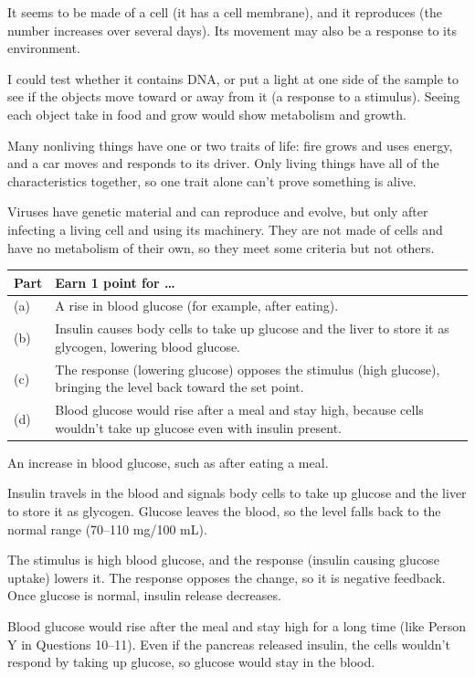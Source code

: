\documentclass[11pt,letterpaper]{article}
\begin{document}
\modelanswer
\begin{parts}
  \item It seems to be made of a cell (it has a cell membrane), and it reproduces (the number increases over several days). Its movement may also be a response to its environment.
  \item I could test whether it contains DNA, or put a light at one side of the sample to see if the objects move toward or away from it (a response to a stimulus). Seeing each object take in food and grow would show metabolism and growth.
  \item Many nonliving things have one or two traits of life: fire grows and uses energy, and a car moves and responds to its driver. Only living things have all of the characteristics together, so one trait alone can't prove something is alive.
  \item Viruses have genetic material and can reproduce and evolve, but only after infecting a living cell and using its machinery. They are not made of cells and have no metabolism of their own, so they meet some criteria but not others.
\end{parts}


\begin{center}
\begin{tabularx}{\linewidth}{@{}lY@{}}
\toprule
Part & Earn 1 point for \dots{} \\
\midrule
(a) & A rise in blood glucose (for example, after eating). \\
(b) & Insulin causes body cells to take up glucose and the liver to store it as glycogen, lowering blood glucose. \\
(c) & The response (lowering glucose) opposes the stimulus (high glucose), bringing the level back toward the set point. \\
(d) & Blood glucose would rise after a meal and stay high, because cells wouldn't take up glucose even with insulin present. \\
\bottomrule
\end{tabularx}
\end{center}

\modelanswer
\begin{parts}
  \item An increase in blood glucose, such as after eating a meal.
  \item Insulin travels in the blood and signals body cells to take up glucose and the liver to store it as glycogen. Glucose leaves the blood, so the level falls back to the normal range (70–110 mg/100 mL).
  \item The stimulus is high blood glucose, and the response (insulin causing glucose uptake) lowers it. The response opposes the change, so it is negative feedback. Once glucose is normal, insulin release decreases.
  \item Blood glucose would rise after the meal and stay high for a long time (like Person Y in Questions 10–11). Even if the pancreas released insulin, the cells wouldn't respond by taking up glucose, so glucose would stay in the blood.
\end{parts}
\end{document}
